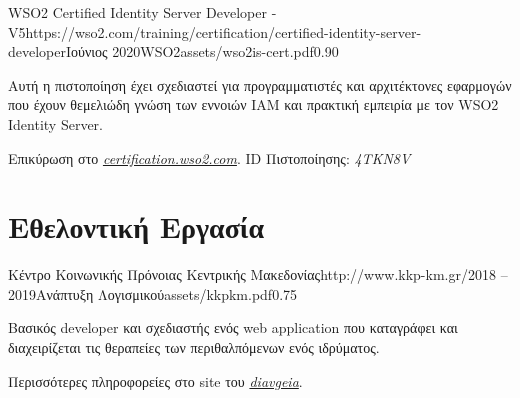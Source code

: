 \documentclass{mycv}
\begin{document}
	\vspace{0.5cm}

	\begin{EntryDatedLogo}{WSO2 Certified Identity Server
			Developer - V5}{https://wso2.com/training/certification/certified-identity-server-developer}{Ιούνιος 2020}{WSO2}{assets/wso2is-cert.pdf}{0.90}
		\begin{Itemize}
			\item Αυτή η πιστοποίηση έχει σχεδιαστεί για προγραμματιστές και αρχιτέκτονες εφαρμογών που έχουν θεμελιώδη γνώση των εννοιών IAM και πρακτική εμπειρία με τον WSO2 Ιdentity Server. 
			\item Επικύρωση στο \href{https://certification.wso2.com}{\textit{certification.wso2.com}}. ID Πιστοποίησης: \textit{4TKN8V}
		\end{Itemize}
	\end{EntryDatedLogo}

	\section{Εθελοντική Εργασία}
	\begin{EntryDatedLogo}{Κέντρο Κοινωνικής Πρόνοιας Κεντρικής Μακεδονίας}{http://www.kkp-km.gr/}{2018 -- 2019}{Ανάπτυξη Λογισμικού}{assets/kkpkm.pdf}{0.75}
		\begin{Itemize}
			\item Βασικός developer και σχεδιαστής ενός web application που καταγράφει και διαχειρίζεται τις θεραπείες των περιθαλπόμενων ενός ιδρύματος.
			\item Περισσότερες πληροφορείες στο site του  \href{https://diavgeia.gov.gr/decision/view/\%CE\%A8\%CE\%A6\%CE\%A1\%CE\%93\%CE\%9F\%CE\%9E\%CE\%A7\%CE\%A3-\%CE\%A0\%CE\%93\%CE\%A6}{\textit{diavgeia}}.
		\end{Itemize}
	\end{EntryDatedLogo}
\end{document}
